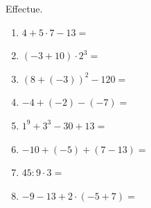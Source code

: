 %
%
	Effectue.
	\begin{enumerate}[cols=2, itemsep=4cm]
		\item \(4+5\cdot 7-13=\)
		\item \(\left(-3+10\right)\cdot 2^3=\)
		\item \(\left(8+(-3)\right)^2 - 120=\)
		\item \(-4+(-2)-(-7)=\)
		\item \(1^9 + 3^3 - 30 + 13=\)
		\item \(-10+(-5) + \left(7-13\right)=\)
		\item \(45:9\cdot 3 =\)
		\item \(-9-13+2\cdot (-5+7)=\)
	\end{enumerate}	
